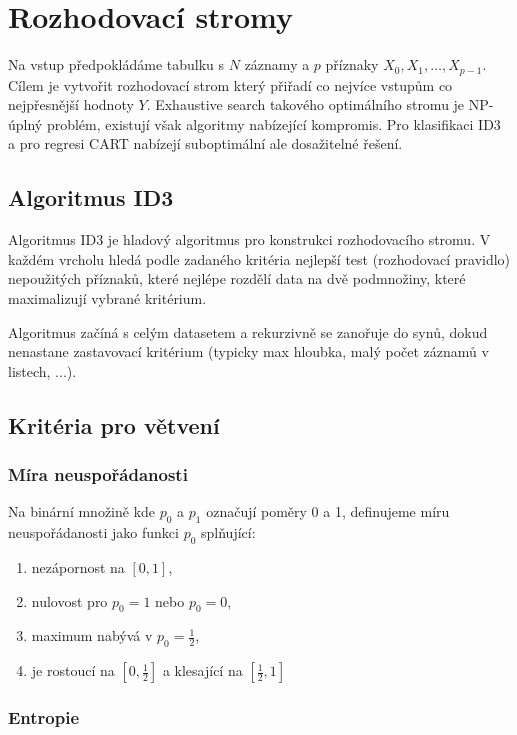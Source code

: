 \documentclass[../main.tex]{subfiles}
\begin{document}
\section{Rozhodovací stromy}

Na vstup předpokládáme tabulku s $N$ záznamy a $p$ příznaky $X_0, X_1, \dots, X_{p-1}$. Cílem je vytvořit rozhodovací strom který přiřadí co nejvíce vstupům co nejpřesnější hodnoty $Y$. Exhaustive search takového optimálního stromu je NP-úplný problém, existují však algoritmy nabízející kompromis. Pro klasifikaci ID3 a pro regresi CART nabízejí suboptimální ale dosažitelné řešení.

\subsection{Algoritmus ID3}

Algoritmus ID3 je hladový algoritmus pro konstrukci rozhodovacího stromu. V každém vrcholu hledá podle zadaného kritéria nejlepší test (rozhodovací pravidlo) nepoužitých příznaků, které nejlépe rozdělí data na dvě podmnožiny, které maximalizují vybrané kritérium.

Algoritmus začíná s celým datasetem a rekurzivně se zanořuje do synů, dokud nenastane zastavovací kritérium (typicky max hloubka, malý počet záznamů v listech, ...).

\subsection{Kritéria pro větvení}

\subsubsection{Míra neuspořádanosti}

Na binární množině kde $p_0$ a $p_1$ označují poměry 0 a 1, definujeme míru neuspořádanosti jako funkci $p_0$ splňující:
\begin{enumerate}
    \item nezápornost na $[0, 1]$,
    \item nulovost pro $p_0 = 1$ nebo $p_0 = 0$,
    \item maximum nabývá v $p_0 = \frac{1}{2}$,
    \item je rostoucí na $\left[0, \frac{1}{2}\right]$ a klesající na $\left[\frac{1}{2}, 1\right]$
\end{enumerate}

\subsubsection{Entropie}
\end{document}
